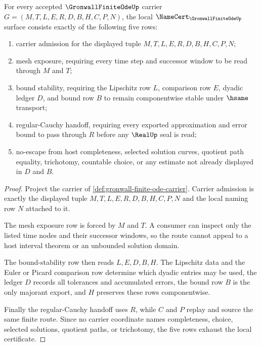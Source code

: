 \begin{theorem}
\label{thm:gronwall-finite-ode-namecert-obligations}
For every accepted $\GronwallFiniteOdeUp$ carrier $G=(M,T,L,E,R,D,B,H,C,P,N)$, the local $\NameCert_{\GronwallFiniteOdeUp}$ surface consists exactly of the following five rows:
\begin{enumerate}
\item carrier admission for the displayed tuple $M,T,L,E,R,D,B,H,C,P,N$;
\item mesh exposure, requiring every time step and successor window to be read through $M$ and $T$;
\item bound stability, requiring the Lipschitz row $L$, comparison row $E$, dyadic ledger $D$, and bound row $B$ to remain componentwise stable under $\hsame$ transport;
\item regular-Cauchy handoff, requiring every exported approximation and error bound to pass through $R$ before any $\RealUp$ seal is read;
\item no-escape from host completeness, selected solution curves, quotient path equality, trichotomy, countable choice, or any estimate not already displayed in $D$ and $B$.
\end{enumerate}
\end{theorem}
\begin{proof}
Project the carrier of \autoref{def:gronwall-finite-ode-carrier}. Carrier admission is exactly the displayed tuple $M,T,L,E,R,D,B,H,C,P,N$ and the local naming row $N$ attached to it.

The mesh exposure row is forced by $M$ and $T$. A consumer can inspect only the listed time nodes and their successor windows, so the route cannot appeal to a host interval theorem or an unbounded solution domain.

The bound-stability row then reads $L,E,D,B,H$. The Lipschitz data and the Euler or Picard comparison row determine which dyadic entries may be used, the ledger $D$ records all tolerances and accumulated errors, the bound row $B$ is the only majorant export, and $H$ preserves these rows componentwise.

Finally the regular-Cauchy handoff uses $R$, while $C$ and $P$ replay and source the same finite route. Since no carrier coordinate names completeness, choice, selected solutions, quotient paths, or trichotomy, the five rows exhaust the local certificate.
\end{proof}

